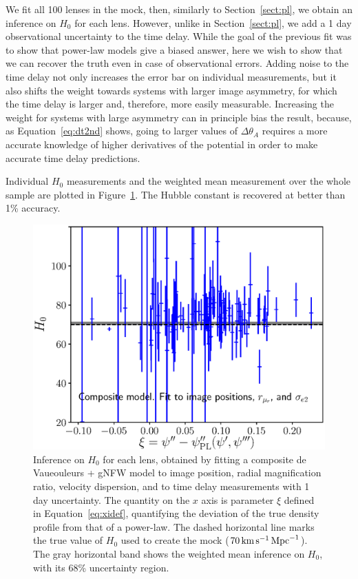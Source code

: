 \documentclass[usenatbib]{mnras}
\def\Sref#1{Section~\ref{#1}\xspace}
\def\Fref#1{Figure~\ref{#1}\xspace}
\def\Eref#1{Equation~\ref{#1}\xspace}
\begin{document}
We fit all 100 lenses in the mock, then, similarly to \Sref{sect:pl}, we obtain an inference on $H_0$ for each lens.
However, unlike in \Sref{sect:pl}, we add a 1 day observational uncertainty to the time delay.
While the goal of the previous fit was to show that power-law models give a biased answer, here we wish to show that we can recover the truth even in case of observational errors.
Adding noise to the time delay not only increases the error bar on individual measurements, but it also shifts the weight towards systems with larger image asymmetry, for which the time delay is larger and, therefore, more easily measurable.
Increasing the weight for systems with large asymmetry can in principle bias the result, because, as \Eref{eq:dt2nd} shows, going to larger values of $\Delta\theta_A$ requires a more accurate knowledge of higher derivatives of the potential in order to make accurate time delay predictions.

Individual $H_0$ measurements and the weighted mean measurement over the whole sample are plotted in \Fref{fig:gnfw_indH0}.
The Hubble constant is recovered at better than 1\% accuracy.
%
\begin{figure}
 \includegraphics[width=\columnwidth]{gnfw_individual_H0.eps}
 \caption{Inference on $H_0$ for each lens, obtained by fitting a composite de Vaueouleurs + gNFW model to image position, radial magnification ratio, velocity dispersion, and to time delay measurements with 1 day uncertainty.
The quantity on the $x$ axis is parameter $\xi$ defined in \Eref{eq:xidef}, quantifying the deviation of the true density profile from that of a power-law.
The dashed horizontal line marks the true value of $H_0$ used to create the mock ($70\,\rm{km}\,\rm{s}^{-1}\,\rm{Mpc}^{-1}$).
The gray horizontal band shows the weighted mean inference on $H_0$, with its 68\% uncertainty region.
}
 \label{fig:gnfw_indH0}
\end{figure}
%
\end{document}
